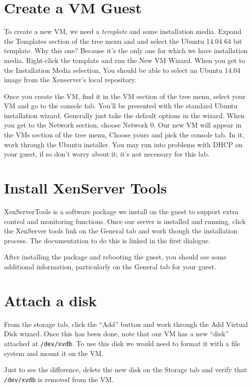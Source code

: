 \documentclass{article}
\begin{document}
 
\section{Create a VM Guest} 
 To create a new VM, we need a \emph{template} and some installation media. Expand the Templates section of the 
 tree menu and  and select the Ubuntu 14.04 64 bit template. Why this one? Because it's the only one for which we have installation media. Right-click the template and run the New VM Wizard. When you get to the Installation Media selection, You should be able to select an Ubuntu 14.04 image from the Xenserver's local repository.
 
 Once you create the VM, find it in the VM section of the tree menu, select your VM and go to the console tab. You'll be presented with the standard Ubuntu installation wizard. Generally just take the default options in the wizard. When you get to the Network section, choose Network 0.
 Our new VM will appear in the VMs section of the tree menu, Choose yours and pick the console tab. In it, work through 
 the Ubuntu installer. You may run into problems with DHCP on your guest, if so don't worry about it; it's not necessary
 for this lab.

\section{Install XenServer Tools}
XenServerTools is a software package we install on the guest to support extra control and monitoring functions. Once 
our server is installed and running, click the XenServer tools link on the General tab and work though the installation 
process. The documentation to do this is linked in the first dialogue.

After installing the package and rebooting the guest, you should see some additional information, particularly on the General tab for your guest.

\section{Attach a disk}
From the storage tab, click the ``Add'' button and work through the Add Virtual Disk wizard. Once this has been done,
note that our VM has a new ``disk'' attached at \texttt{/dev/xvdb}. To use this disk we would need to format it with a file 
system and mount it on the VM.

Just to see the difference, delete the new disk on the Storage tab and verify that \texttt{/dev/xvdb} is removed from the 
VM.
\end{document}
